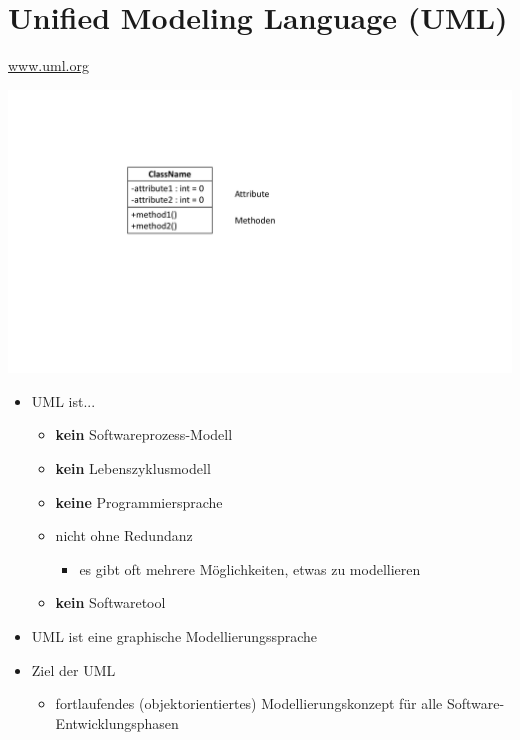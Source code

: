 \section{Unified Modeling Language (UML)}
\href{www.uml.org}{www.uml.org}
\vspace{-\baselineskip}
\begin{multicols}{2}
\begin{minipage}{\linewidth}
	\includegraphics[width=\linewidth]{images/klasse3.pdf}
\end{minipage}
\begin{itemize}
	\item UML ist...
	\begin{itemize}
		\item \textbf{kein} Softwareprozess-Modell
		\item \textbf{kein} Lebenszyklusmodell
		\item \textbf{keine} Programmiersprache
		\item nicht ohne Redundanz
		\begin{itemize}
			\item es gibt oft mehrere Möglichkeiten, etwas zu modellieren
		\end{itemize}
		\item \textbf{kein} Softwaretool
	\end{itemize}
\end{itemize}
\vfill\null
\columnbreak
\begin{itemize}
	\item UML ist eine graphische Modellierungssprache
	\item Ziel der UML
	\begin{itemize}
		\item fortlaufendes (objektorientiertes) Modellierungskonzept für alle Software-Entwicklungsphasen
	\end{itemize}

\end{itemize}
\end{multicols}
